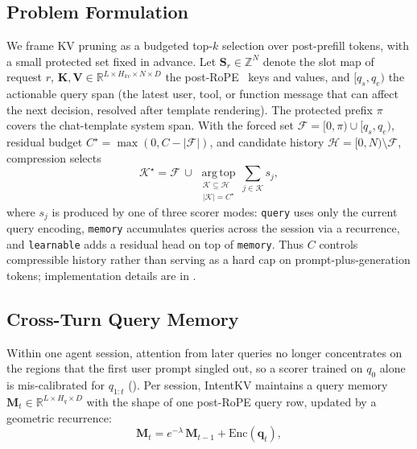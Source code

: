 \documentclass[11pt]{article}
\newcommand{\method}{IntentKV\xspace}
\begin{document}
\subsection{Problem Formulation}
\label{sec:method-problem}

We frame KV pruning as a budgeted top-$k$ selection over post-prefill
tokens, with a small protected set fixed in advance. Let
$\mathbf{S}_r\!\in\!\mathbb{Z}^N$ denote the slot map of request
$r$, $\mathbf{K},\mathbf{V}\!\in\!\mathbb{R}^{L\times H_{kv}\times
N\times D}$ the post-RoPE~\citep{su2024roformer} keys and values, and $[q_s,q_e)$ the
actionable query span (the latest user, tool, or function message
that can affect the next decision, resolved after template
rendering). The protected prefix $\pi$ covers the chat-template
system span. With the forced set
$\mathcal{F}\!=\![0,\pi)\cup[q_s,q_e)$, residual budget
$C^{\star}\!=\!\max(0,C-|\mathcal{F}|)$, and candidate history
$\mathcal{H}\!=\![0,N)\setminus\mathcal{F}$, compression selects
\begin{equation}
\mathcal{K}^{\star}=\mathcal{F}\,\cup\,
\operatorname*{arg\,top}_{\substack{\mathcal{K}\subseteq\mathcal{H}\\ |\mathcal{K}|=C^{\star}}}
\sum_{j\in\mathcal{K}} s_j,
\label{eq:topk}
\end{equation}
where $s_j$ is produced by one of three scorer modes:
\texttt{query} uses only the current query encoding,
\texttt{memory} accumulates queries across the session via a
recurrence, and \texttt{learnable} adds a residual head on top of
\texttt{memory}. Thus $C$ controls compressible history rather
than serving as a hard cap on prompt-plus-generation tokens;
implementation details are in .

\subsection{Cross-Turn Query Memory}
\label{sec:method-memory}

Within one agent session, attention from later queries no longer
concentrates on the regions that the first user prompt singled out,
so a scorer trained on $q_0$ alone is mis-calibrated for $q_{1{:}t}$
(). Per session, \method maintains a
query memory
$\mathbf{M}_t\!\in\!\mathbb{R}^{L\times H_q\times D}$ with the shape
of one post-RoPE query row, updated by a geometric recurrence:
\begin{equation}
\mathbf{M}_t = e^{-\lambda}\,\mathbf{M}_{t-1} +
\mathrm{Enc}(\mathbf{q}_t),
\label{eq:memory-update}
\end{equation}
\end{document}
